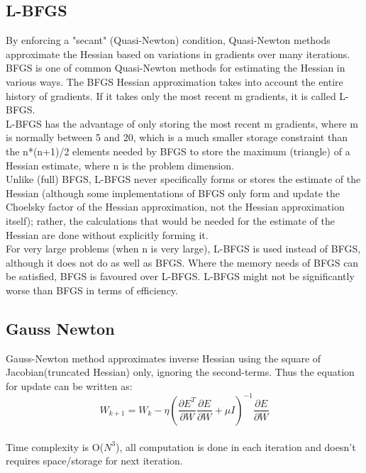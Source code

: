 \documentclass[journal]{IEEEtran}
\begin{document}
\subsection{L-BFGS}
By enforcing a "secant" (Quasi-Newton) condition, Quasi-Newton methods approximate the Hessian based on variations in gradients over many iterations. BFGS is one of common Quasi-Newton methods for estimating the Hessian in various ways. The BFGS Hessian approximation takes into account the entire history of gradients. If it takes only the most recent m gradients, it is called L-BFGS. \\
L-BFGS has the advantage of only storing the most recent m gradients, where m is normally between 5 and 20, which is a much smaller storage constraint than the n*(n+1)/2 elements needed by BFGS to store the maximum (triangle) of a Hessian estimate, where n is the problem dimension. \\
Unlike (full) BFGS, L-BFGS never specifically forms or stores the estimate of the Hessian (although some implementations of BFGS only form and update the Choelsky factor of the Hessian approximation, not the Hessian approximation itself); rather, the calculations that would be needed for the estimate of the Hessian are done without explicitly forming it. \\
For very large problems (when n is very large), L-BFGS is used instead of BFGS, although it does not do as well as BFGS. Where the memory needs of BFGS can be satisfied, BFGS is favoured over L-BFGS. L-BFGS might not be significantly worse than BFGS in terms of efficiency.

\subsection{Gauss Newton }
Gauss-Newton \cite{lecun2012efficient} method approximates inverse Hessian using the square of Jacobian(truncated Hessian) only,  ignoring the second-terms. Thus the equation for update can be written as: \\
$$ W_{k+1}=W_{k}-\eta\left(\frac{\partial E^{T}}{\partial W} \frac{\partial E}{\partial W}+\mu I\right)^{-1} \frac{\partial E}{\partial W} $$ \\

Time complexity is O($N^3$), all computation is done in each iteration and doesn't requires space/storage for next iteration.
\end{document}
